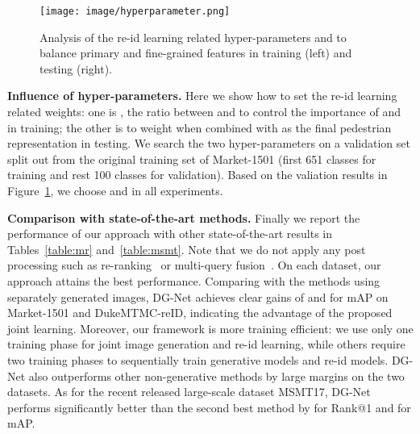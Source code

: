 \documentclass[10pt,twocolumn,letterpaper]{article}
\begin{document}
\begin{figure}[t]
\begin{center}
   \texttt{[image: image/hyperparameter.png]}
\end{center}
\vspace{-.2in}
   \caption{Analysis of the re-id learning related hyper-parameters  and  to balance primary and fine-grained features in training (left) and testing (right).  
}
\label{fig:hyper}
\end{figure}

\textbf{Influence of hyper-parameters.}
\label{sec:hyper}
Here we show how to set the re-id learning related weights: one is , the ratio between  and  to control the importance of  and  in training; the other is  to weight  when combined with  as the final pedestrian representation in testing. We search the two hyper-parameters on a validation set split out from the original training set of Market-1501 (first 651 classes for training and rest 100 classes for validation). Based on the valiation results in Figure~\ref{fig:hyper}, we choose  and  in all experiments.

\textbf{Comparison with state-of-the-art methods.}
Finally we report the performance of our approach with other state-of-the-art results in Tables~\ref{table:mr} and~\ref{table:msmt}. Note that we do not apply any post processing such as re-ranking~\cite{yu2017divide} or multi-query fusion~\cite{zheng2015scalable}. On each dataset, our approach attains the best performance. Comparing with the methods using separately generated images, DG-Net achieves clear gains of  and  for mAP on Market-1501 and DukeMTMC-reID, indicating the advantage of the proposed joint learning. Moreover, our framework is more training efficient: we use only one training phase for joint image generation and re-id learning, while others require two training phases to sequentially train generative models and re-id models. DG-Net also outperforms other non-generative methods by large margins on the two datasets. As for the recent released large-scale dataset MSMT17, DG-Net performs significantly better than the second best method by  for Rank@1 and  for mAP.           
\end{document}

